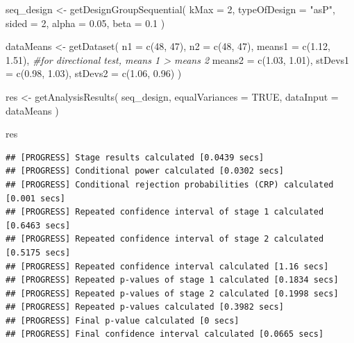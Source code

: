 \documentclass[
  oneside]{book}
\newenvironment{Shaded}{\begin{snugshade}}{\end{snugshade}}
\newcommand{\AttributeTok}[1]{\textcolor[rgb]{0.77,0.63,0.00}{#1}}
\newcommand{\CommentTok}[1]{\textcolor[rgb]{0.56,0.35,0.01}{\textit{#1}}}
\newcommand{\ConstantTok}[1]{\textcolor[rgb]{0.00,0.00,0.00}{#1}}
\newcommand{\DecValTok}[1]{\textcolor[rgb]{0.00,0.00,0.81}{#1}}
\newcommand{\FloatTok}[1]{\textcolor[rgb]{0.00,0.00,0.81}{#1}}
\newcommand{\FunctionTok}[1]{\textcolor[rgb]{0.00,0.00,0.00}{#1}}
\newcommand{\NormalTok}[1]{#1}
\newcommand{\OtherTok}[1]{\textcolor[rgb]{0.56,0.35,0.01}{#1}}
\newcommand{\StringTok}[1]{\textcolor[rgb]{0.31,0.60,0.02}{#1}}
\begin{document}
\begin{Shaded}
\begin{Highlighting}[]
\NormalTok{seq\_design }\OtherTok{\textless{}{-}} \FunctionTok{getDesignGroupSequential}\NormalTok{(}
  \AttributeTok{kMax =} \DecValTok{2}\NormalTok{,}
  \AttributeTok{typeOfDesign =} \StringTok{"asP"}\NormalTok{,}
  \AttributeTok{sided =} \DecValTok{2}\NormalTok{,}
  \AttributeTok{alpha =} \FloatTok{0.05}\NormalTok{,}
  \AttributeTok{beta =} \FloatTok{0.1}
\NormalTok{)}

\NormalTok{dataMeans }\OtherTok{\textless{}{-}} \FunctionTok{getDataset}\NormalTok{(}
  \AttributeTok{n1 =} \FunctionTok{c}\NormalTok{(}\DecValTok{48}\NormalTok{, }\DecValTok{47}\NormalTok{), }
  \AttributeTok{n2 =} \FunctionTok{c}\NormalTok{(}\DecValTok{48}\NormalTok{, }\DecValTok{47}\NormalTok{), }
  \AttributeTok{means1 =} \FunctionTok{c}\NormalTok{(}\FloatTok{1.12}\NormalTok{, }\FloatTok{1.51}\NormalTok{), }\CommentTok{\#for directional test, means 1 \textgreater{} means 2}
  \AttributeTok{means2 =} \FunctionTok{c}\NormalTok{(}\FloatTok{1.03}\NormalTok{, }\FloatTok{1.01}\NormalTok{),}
  \AttributeTok{stDevs1 =} \FunctionTok{c}\NormalTok{(}\FloatTok{0.98}\NormalTok{, }\FloatTok{1.03}\NormalTok{), }
  \AttributeTok{stDevs2 =} \FunctionTok{c}\NormalTok{(}\FloatTok{1.06}\NormalTok{, }\FloatTok{0.96}\NormalTok{)}
\NormalTok{  )}

\NormalTok{res }\OtherTok{\textless{}{-}} \FunctionTok{getAnalysisResults}\NormalTok{(}
\NormalTok{  seq\_design, }
  \AttributeTok{equalVariances =} \ConstantTok{TRUE}\NormalTok{,}
  \AttributeTok{dataInput =}\NormalTok{ dataMeans}
\NormalTok{  )}

\NormalTok{res}
\end{Highlighting}
\end{Shaded}

\begin{verbatim}
## [PROGRESS] Stage results calculated [0.0439 secs] 
## [PROGRESS] Conditional power calculated [0.0302 secs] 
## [PROGRESS] Conditional rejection probabilities (CRP) calculated [0.001 secs] 
## [PROGRESS] Repeated confidence interval of stage 1 calculated [0.6463 secs] 
## [PROGRESS] Repeated confidence interval of stage 2 calculated [0.5175 secs] 
## [PROGRESS] Repeated confidence interval calculated [1.16 secs] 
## [PROGRESS] Repeated p-values of stage 1 calculated [0.1834 secs] 
## [PROGRESS] Repeated p-values of stage 2 calculated [0.1998 secs] 
## [PROGRESS] Repeated p-values calculated [0.3982 secs] 
## [PROGRESS] Final p-value calculated [0 secs] 
## [PROGRESS] Final confidence interval calculated [0.0665 secs]
\end{verbatim}
\end{document}
